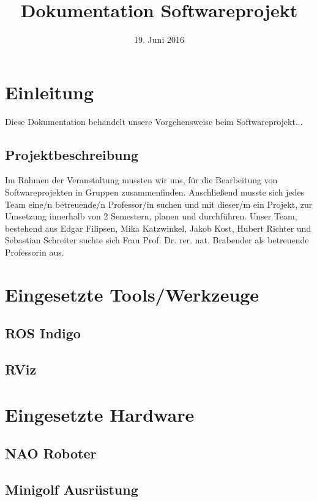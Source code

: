 \documentclass{scrartcl}
\title{Dokumentation Softwareprojekt}
\date{19. Juni 2016}
\begin{document}
\maketitle
\tableofcontents
\newpage

\section{Einleitung}

Diese Dokumentation behandelt unsere Vorgehensweise beim Softwareprojekt...

\subsection{Projektbeschreibung}

Im Rahmen der Veranstaltung mussten wir uns, für die Bearbeitung von Softwareprojekten in Gruppen zusammenfinden. Anschließend musste sich jedes Team eine/n betreuende/n Professor/in suchen und mit dieser/m ein Projekt, zur Umsetzung innerhalb von 2 Semestern, planen und durchführen. Unser Team, bestehend aus Edgar Filipsen, Mika Katzwinkel, Jakob Kost, Hubert Richter und Sebastian Schreiter suchte sich Frau Prof. Dr. rer. nat. Brabender als betreuende Professorin aus. 

\section{Eingesetzte Tools/Werkzeuge}

\subsection{ROS Indigo}

\subsection{RViz}

\section{Eingesetzte Hardware}

\subsection{NAO Roboter}

\subsection{Minigolf Ausrüstung}
\end{document}
